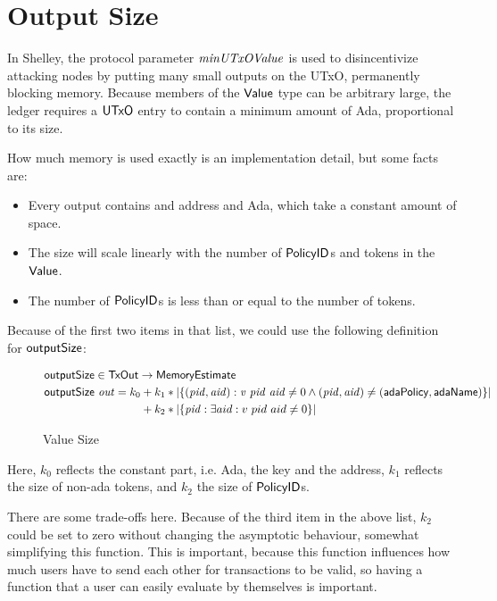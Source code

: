 \section{Output Size}
\label{sec:value-size}

In Shelley, the protocol parameter $\mathit{minUTxOValue}$ is used to
disincentivize attacking nodes by putting many small outputs on the
UTxO, permanently blocking memory. Because members of the $\mathsf{Value}$
type can be arbitrary large, the ledger requires a $\mathsf{UTxO}$ entry to
contain a minimum amount of Ada, proportional to its size.

How much memory is used exactly is an implementation detail, but some facts are:
\begin{itemize}
  \item Every output contains and address and Ada, which take a constant amount of space.
  \item The size will scale linearly with the number of $\mathsf{PolicyID}$s and tokens in the $\mathsf{Value}$.
  \item The number of $\mathsf{PolicyID}$s is less than or equal to the number of tokens.
\end{itemize}

Because of the first two items in that list, we could use the following definition for $\mathsf{outputSize}$:

\begin{figure*}[h]
  \begin{align*}
    & \fun{outputSize} \in \TxOut \to \MemoryEstimate \\
    & \fun{outputSize} ~\var{out} = k_0 + k_1 * |\{ (\var{pid}, \var{aid}) : \var{v}~\var{pid}~\var{aid} \neq 0
            \land (\var{pid}, \var{aid}) \neq (\mathsf{adaPolicy}, \mathsf{adaName}) \}| \\
    & \phantom{\fun{outputSize} ~\var{out} = k_0} + k_2 * |\{ \var{pid} : \exists aid : v~pid~aid \neq 0 \}|
  \end{align*}
  \caption{Value Size}
  \label{fig:test}
\end{figure*}

Here, $k_0$ reflects the constant part, i.e. Ada, the key and the address, $k_1$ reflects the
size of non-ada tokens, and $k_2$ the size of $\mathsf{PolicyID}$s.

There are some trade-offs here. Because of the third item in the above
list, $k_2$ could be set to zero without changing the asymptotic
behaviour, somewhat simplifying this function. This is important,
because this function influences how much users have to send each
other for transactions to be valid, so having a function that a user
can easily evaluate by themselves is important.
